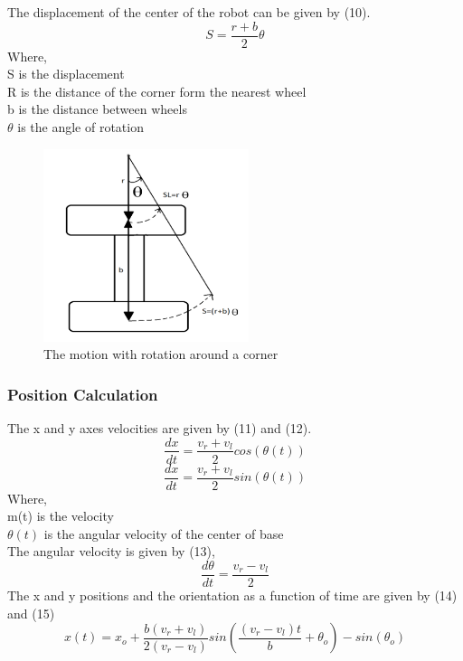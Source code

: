 \documentclass[conference]{IEEEtran}
\begin{document}
The displacement of the center of the robot can be given by (10).
\begin{equation} \label{eq:11}
S=\frac{r+b}{2}\theta
\end{equation}
Where,\\
S is the displacement\\
R is the distance of the corner form the nearest wheel\\
b is the distance between wheels\\
$\theta$  is the angle of rotation\\

\begin{figure}[h]
\includegraphics[width=6cm]{motionwithrotation.png}
\centering
\caption{The motion with rotation around a corner}\label{net_img}
\end{figure}

\subsubsection{Position Calculation}
The x and y axes velocities are given by (11) and (12).
\begin{equation} \label{eq:12}
\frac{dx}{dt}=\frac{v_r+v_l}{2}cos(\theta(t))
\end{equation}
\begin{equation} \label{eq:13}
\frac{dx}{dt}=\frac{v_r+v_l}{2}sin(\theta(t))
\end{equation}
Where,\\
m(t) is the velocity \\
$\theta(t)$ is the angular velocity of the center of base\\
The angular velocity is given by (13),\\
\begin{equation} \label{eq:14}
\frac{d\theta}{dt}=\frac{v_r-v_l}{2}
\end{equation}
The x and y positions and the orientation as a function of time are given by (14) and (15)\\
\begin{equation} \label{eq:15}
x(t)=x_o+\frac{b(v_r+v_l)}{2(v_r-v_l)}sin(\frac{(v_r-v_l)t}{b}+\theta_o)-sin(\theta_o)
\end{equation}
\end{document}
